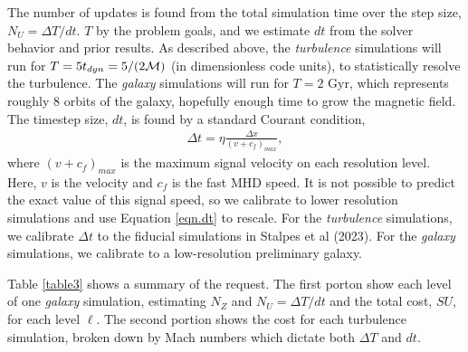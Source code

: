 The number of updates is found from the total simulation time over the step
size, $N_U=\Delta T/d t$. $T$ by the
problem goals, and we estimate $dt$ from the solver behavior and prior
results.
As described above, the \emph{turbulence} simulations will run for
 $T=5 t_{dyn} = 5/(2\mathcal{M})$ (in dimensionless code units), to statistically
resolve the turbulence. The \emph{galaxy} simulations will run for $T=2$ Gyr,
which represents roughly 8 orbits of the galaxy, hopefully enough time to grow
the magnetic field.  The timestep size, $dt$,
is found by a standard Courant condition,
\begin{align}
	\Delta t = \eta \frac{\Delta x}{(v+c_f)_{max}} \label{eqn.dt},
\end{align}
where $(v+c_f)_{max}$ is the maximum signal velocity on each resolution level.  Here, $v$ is the velocity
and $c_f$ is the fast MHD speed.  It is not possible to predict the exact value
of this signal speed, so we calibrate to lower resolution simulations and use
Equation \ref{eqn.dt} to rescale.  For the \emph{turbulence} simulations, we
calibrate $\Delta t$ to the fiducial simulations in Stalpes et al (2023).  For
the \emph{galaxy} simulations, we calibrate to a low-resolution preliminary
galaxy.

Table \ref{table3} shows a summary of the request.  The first porton show each
level of one  \emph{galaxy} simulation, estimating $N_Z$ and $N_U=\Delta T/d t$ and the total
cost, $SU$, for each level $\ell$.  The second portion shows the cost for each
turbulence simulation, broken down by Mach numbers which dictate both $\Delta T$
and $dt$.
